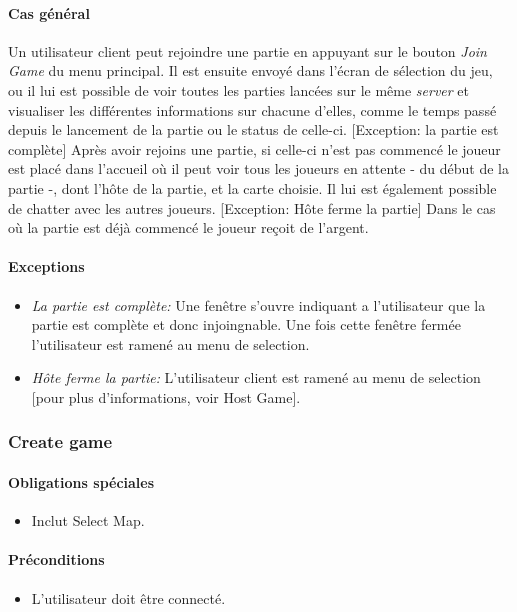 \documentclass[a4paper,11pt]{report}
\begin{document}
\paragraph{Cas général}
Un utilisateur client peut rejoindre une partie en appuyant sur le bouton \og \textit{Join Game} \fg 
du menu principal.
Il est ensuite envoyé dans l'écran de sélection du jeu, ou il lui est possible de voir toutes les parties lancées sur le
même \textit{server} et visualiser les différentes informations sur chacune d'elles, comme le temps passé depuis le lancement
de la partie ou le status de celle-ci.
[Exception: la partie est complète]
Après avoir rejoins une partie, si celle-ci n'est pas commencé le joueur est placé dans l’accueil où il peut
voir tous les joueurs en attente - du début de la partie -, dont l’hôte de la partie, et la carte choisie. Il lui
est également possible de chatter avec les autres joueurs. 
[Exception: Hôte ferme la partie]
Dans le cas où la partie est déjà commencé le joueur reçoit de l'argent.
\paragraph{Exceptions}
\begin{itemize}
 \item \textit{La partie est complète:} Une fenêtre s'ouvre indiquant a l'utilisateur que la partie est complète
 et donc injoingnable. Une fois cette fenêtre fermée l'utilisateur est ramené au menu de selection.
 \item \textit{Hôte ferme la partie:} L'utilisateur client est ramené au menu de selection [pour plus d'informations, voir
 Host Game]. 
\end{itemize}

\subsubsection{Create game}
\paragraph{Obligations spéciales}
\begin{itemize}
 \item Inclut Select Map.
\end{itemize}
\paragraph{Préconditions}
\begin{itemize}
 \item L'utilisateur doit être connecté.
\end{itemize}
\end{document}
